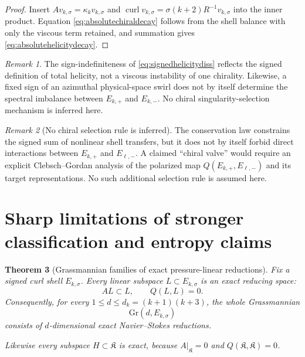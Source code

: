 \documentclass[
 aps,
 prd,
 reprint,
 amsmath,
 amssymb,
 nofootinbib,
 superscriptaddress
]{revtex4-2}
\newtheorem{theorem}{Theorem}[section]
\theoremstyle{definition}
\theoremstyle{remark}
\newtheorem{remark}[theorem]{Remark}
\newcommand{\cK}{\mathfrak K}
\newcommand{\curl}{\operatorname{curl}}
\begin{document}
\begin{proof}
Insert
$Av_{k,\sigma}=\kappa_kv_{k,\sigma}$ and
$\curl v_{k,\sigma}=\sigma(k+2)R^{-1}v_{k,\sigma}$
into the inner product.  Equation \eqref{eq:absolutechiraldecay} follows
from the shell balance with only the viscous term retained, and summation
gives \eqref{eq:absolutehelicitydecay}.
\end{proof}

\begin{remark}
The sign-indefiniteness of \eqref{eq:signedhelicitydiss} reflects the signed
definition of total helicity, not a viscous instability of one chirality.
Likewise, a fixed sign of an azimuthal physical-space swirl does not by
itself determine the spectral imbalance between $E_{k,+}$ and $E_{k,-}$.
No chiral singularity-selection mechanism is inferred here.
\end{remark}

\begin{remark}[No chiral selection rule is inferred]
The conservation law constrains the signed sum of nonlinear shell transfers,
but it does not by itself forbid direct interactions between
$E_{k,+}$ and $E_{\ell,-}$.  A claimed ``chiral valve'' would require an
explicit Clebsch--Gordan analysis of the polarized map
$Q(E_{k,+},E_{\ell,-})$ and its target representations.  No such additional
selection rule is assumed here.
\end{remark}




\section{Sharp limitations of stronger classification and entropy claims}
\label{sec:limitations}


\begin{theorem}[Grassmannian families of exact pressure-linear reductions]
\label{thm:grassmannreductions}
Fix a signed curl shell $E_{k,\sigma}$.  Every linear subspace
$L\subset E_{k,\sigma}$ is an exact reducing space:
\begin{equation}
 AL\subset L,
 \qquad
 Q(L,L)=0.
 \label{eq:grassmannexact}
\end{equation}
Consequently, for every $1\le d\le d_k=(k+1)(k+3)$, the whole Grassmannian
\begin{equation}
 \mathrm{Gr}(d,E_{k,\sigma})
 \label{eq:grassmannfamily}
\end{equation}
consists of $d$-dimensional exact Navier--Stokes reductions.

Likewise every subspace $H\subset\cK$ is exact, because
$A|_{\cK}=0$ and $Q(\cK,\cK)=0$.
\end{theorem}
\end{document}
